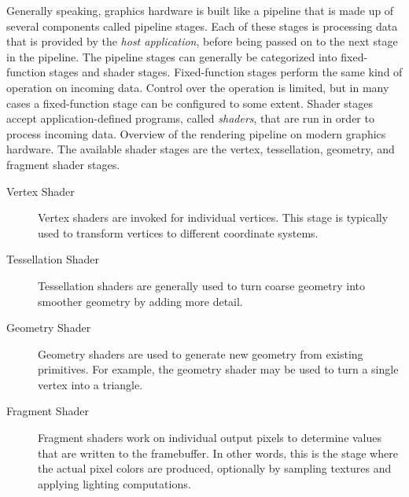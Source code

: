     Generally speaking, graphics hardware is built like a pipeline that is made up of several components called pipeline stages.
    Each of these stages is processing data that is provided by the \textit{host application}, before being passed on to the next stage in the pipeline.
    The pipeline stages can generally be categorized into fixed-function stages and shader stages.
    Fixed-function stages perform the same kind of operation on incoming data.
    Control over the operation is limited, but in many cases a fixed-function stage can be configured to some extent.
    Shader stages accept application-defined programs, called \textit{shaders}, that are run in order to process incoming data.
    Overview of the rendering pipeline on modern graphics hardware.
    The available shader stages are the vertex, tessellation, geometry, and fragment shader stages.


    \begin{description}
      \item[Vertex Shader]
        Vertex shaders are invoked for individual vertices.
        This stage is typically used to transform vertices to different coordinate systems.

      \item[Tessellation Shader]
        Tessellation shaders are generally used to turn coarse geometry into smoother geometry by adding more detail.

      \item[Geometry Shader]
        Geometry shaders are used to generate new geometry from existing primitives.
        For example, the geometry shader may be used to turn a single vertex into a triangle.

      \item[Fragment Shader]
        Fragment shaders work on individual output pixels to determine values that are written to the framebuffer.
        In other words, this is the stage where the actual pixel colors are produced, optionally by sampling textures and applying lighting computations.
    \end{description}



